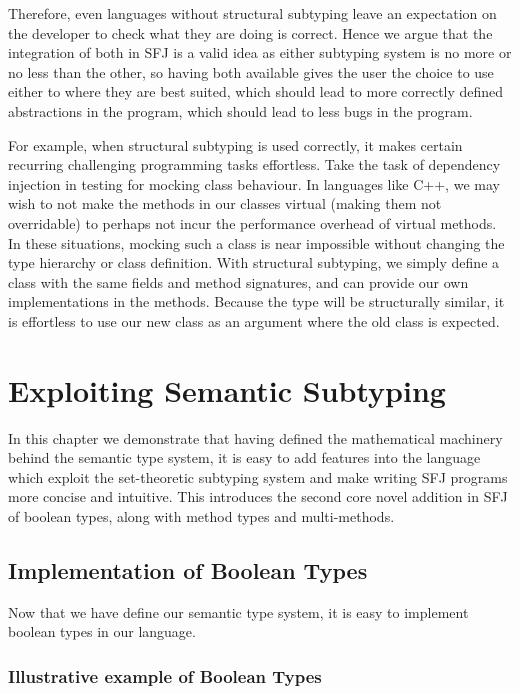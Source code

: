 \documentclass{l4proj}
\begin{document}
Therefore, even languages without structural subtyping leave an expectation on the developer to check what they are doing is correct.
Hence we argue that the integration of both in SFJ is a valid idea as either subtyping system is no more or no less than the other, so having both available gives the user the choice to use either to where they are best suited, which should lead to more correctly defined abstractions in the program, which should lead to less bugs in the program.

For example, when structural subtyping is used correctly, it makes certain recurring challenging programming tasks effortless.
Take the task of dependency injection in testing for mocking class behaviour.
In languages like C++, we may wish to not make the methods in our classes virtual (making them not overridable) to perhaps not incur the performance overhead of virtual methods.
In these situations, mocking such a class is near impossible without changing the type hierarchy or class definition.
With structural subtyping, we simply define a class with the same fields and method signatures, and can provide our own implementations in the methods.
Because the type will be structurally similar, it is effortless to use our new class as an argument where the old class is expected.

\chapter{Exploiting Semantic Subtyping}

In this chapter we demonstrate that having defined the mathematical machinery behind the semantic type system, it is easy to add features into the language which exploit the set-theoretic subtyping system and make writing SFJ programs more concise and intuitive.
This introduces the second core novel addition in SFJ of boolean types, along with method types and multi-methods.

\section{Implementation of Boolean Types}
\label{sec:bool}

Now that we have define our semantic type system, it is easy to implement boolean types in our language.

\subsection{Illustrative example of Boolean Types}
\end{document}
